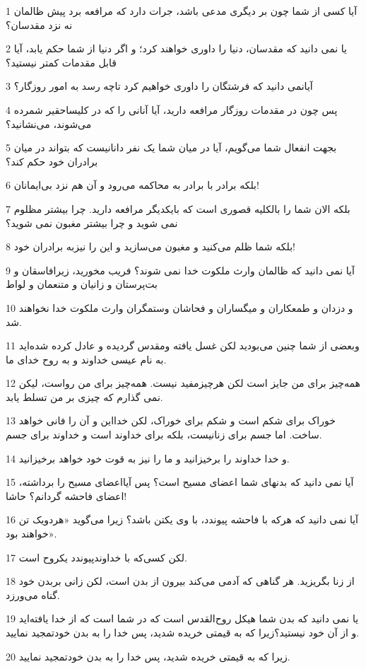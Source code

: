 \par 1 آیا کسی از شما چون بر دیگری مدعی باشد، جرات دارد که مرافعه برد پیش ظالمان نه نزد مقدسان؟
\par 2 یا نمی دانید که مقدسان، دنیا را داوری خواهند کرد؛ و اگر دنیا از شما حکم یابد، آیا قابل مقدمات کمتر نیستید؟
\par 3 آیانمی دانید که فرشتگان را داوری خواهیم کرد تاچه رسد به امور روزگار؟
\par 4 پس چون در مقدمات روزگار مرافعه دارید، آیا آنانی را که در کلیساحقیر شمرده می‌شوند، می‌نشانید؟
\par 5 بجهت انفعال شما می‌گویم، آیا در میان شما یک نفر دانانیست که بتواند در میان برادران خود حکم کند؟
\par 6 بلکه برادر با برادر به محاکمه می‌رود و آن هم نزد بی‌ایمانان!
\par 7 بلکه الان شما را بالکلیه قصوری است که بایکدیگر مرافعه دارید. چرا بیشتر مظلوم نمی شوید و چرا بیشتر مغبون نمی شوید؟
\par 8 بلکه شما ظلم می‌کنید و مغبون می‌سازید و این را نیزبه برادران خود!
\par 9 آیا نمی دانید که ظالمان وارث ملکوت خدا نمی شوند؟ فریب مخورید، زیرافاسقان و بت‌پرستان و زانیان و متنعمان و لواط
\par 10 و دزدان و طمعکاران و میگساران و فحاشان وستمگران وارث ملکوت خدا نخواهند شد.
\par 11 وبعضی از شما چنین می‌بودید لکن غسل یافته ومقدس گردیده و عادل کرده شده‌اید به نام عیسی خداوند و به روح خدای ما.
\par 12 همه‌چیز برای من جایز است لکن هرچیزمفید نیست. همه‌چیز برای من رواست، لیکن نمی گذارم که چیزی بر من تسلط یابد.
\par 13 خوراک برای شکم است و شکم برای خوراک، لکن خدااین و آن را فانی خواهد ساخت. اما جسم برای زنانیست، بلکه برای خداوند است و خداوند برای جسم.
\par 14 و خدا خداوند را برخیزانید و ما را نیز به قوت خود خواهد برخیزانید.
\par 15 آیا نمی دانید که بدنهای شما اعضای مسیح است؟ پس آیااعضای مسیح را برداشته، اعضای فاحشه گردانم؟ حاشا!
\par 16 آیا نمی دانید که هرکه با فاحشه پیوندد، با وی یکتن باشد؟ زیرا می‌گوید «هردویک تن خواهند بود».
\par 17 لکن کسی‌که با خداوندپیوندد یکروح است.
\par 18 از زنا بگریزید. هر گناهی که آدمی می‌کند بیرون از بدن است، لکن زانی بربدن خود گناه می‌ورزد.
\par 19 یا نمی دانید که بدن شما هیکل روح‌القدس است که در شما است که از خدا یافته‌اید و از آن خود نیستید؟زیرا که به قیمتی خریده شدید، پس خدا را به بدن خودتمجید نمایید.
\par 20 زیرا که به قیمتی خریده شدید، پس خدا را به بدن خودتمجید نمایید.

